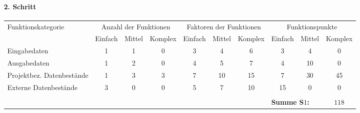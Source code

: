 \newpage
\begin{landscape}
	\paragraph{2. Schritt}
	\begin{center}
		\begin{tabular}{|l|ccc|ccc|ccc|}
			\hline
			\multirow{2}{*}{Funktionskategorie} & \multicolumn{3}{c|}{Anzahl der Funktionen} & \multicolumn{3}{c|}{Faktoren der Funktionen} & \multicolumn{3}{c|}{Funktionspunkte}\\
			& Einfach & Mittel & Komplex & Einfach & Mittel & Komplex & Einfach & Mittel & Komplex\\
			\hline
			Eingabedaten & 1 & 1 & 0 & 3 & 4 & 6 & 3 & 4 & 0\\
			Ausgabedaten & 1 & 2 & 0 & 4 & 5 & 7 & 4 & 10 & 0\\
			Projektbez. Datenbestände & 1 & 3 & 3 & 7 & 10 & 15 & 7 & 30 & 45\\
			Externe Datenbestände & 3 & 0 & 0 & 5 & 7 & 10 & 15 & 0 & 0\\
			\hline
			\multicolumn{10}{c}{}\\
			\cline{8-10}
			\multicolumn{7}{c}{} & \multicolumn{2}{|l|}{{\bf Summe S$1$:}} & {\bf $118$}\\
			\cline{8-10}			
		\end{tabular}
	\end{center}
	\vspace{0.2cm}
	\begin{minipage}{0.7\textwidth}

\end{minipage}
\end{landscape}
